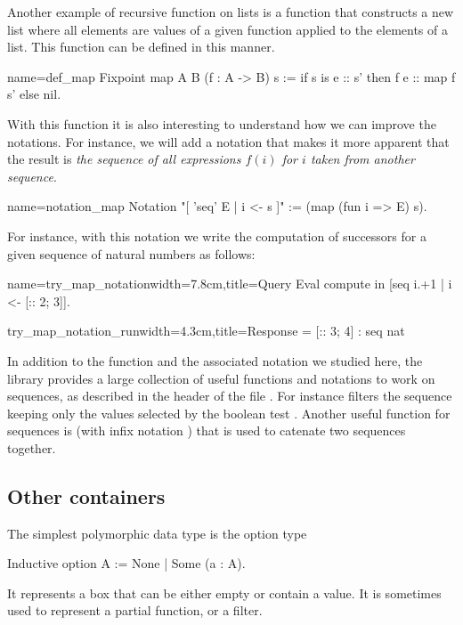 Another example of recursive function on lists is a function that constructs
a new list where all elements are values of a given function applied to
the elements of a list.  This function can be defined in this
manner.

\begin{coq}{name=def_map}{}
Fixpoint map A B (f : A -> B) s :=
  if s is e :: s' then f e :: map f s' else nil.
\end{coq}
With this function it is also interesting to understand how we can
improve the notations.  For instance, we will add a notation that
makes it more apparent that the result is {\em the sequence of all
expressions \(f(i)\) for \(i\) taken from another sequence}.

\begin{coq}{name=notation_map}{}
Notation "[ 'seq' E | i <- s ]" := (map (fun i => E) s).
\end{coq}
For instance, with this notation we write the computation of successors
for a given sequence of natural numbers as follows:

\begin{coq}{name=try_map_notation}{width=7.8cm,title=Query}
Eval compute in [seq i.+1 | i <- [:: 2; 3]].
\end{coq}
\begin{coqout}{try_map_notation_run}{width=4.3cm,title=Response}
= [:: 3; 4] : seq nat
\end{coqout}
\index[coq]{\C{[seq .. | x <- ..]}}
In addition to the function  and the associated notation
we studied here, the \mcbMC{} library
provides a large collection of useful functions and notations to work on
sequences, as described in the header of the file .  For
instance \C{[seq i <- s | p]} filters the sequence  keeping only
the values selected by the boolean test .
Another useful function for sequences is  (with infix notation \C{++})
that is used to catenate two sequences together.

\subsection{Other containers}\label{sec:othercontainers}
The simplest polymorphic data type is the option type

\begin{coq}{}{}
Inductive option A := None | Some (a : A).
\end{coq}
It represents a box that can be either empty or contain a value.
It is sometimes used to represent a partial function, or a filter.

